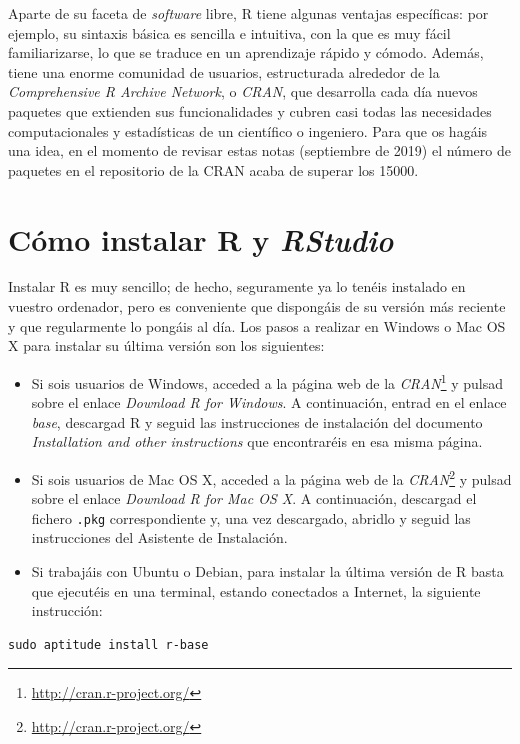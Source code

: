 \documentclass[
]{book}
\DeclareRobustCommand{\href}[2]{#2\footnote{\url{#1}}}
\theoremstyle{definition}
\theoremstyle{definition}
\theoremstyle{definition}
\theoremstyle{remark}
\begin{document}
Aparte de su faceta de \emph{software} libre, R tiene algunas ventajas específicas: por ejemplo, su sintaxis básica es sencilla e intuitiva, con la que es muy fácil familiarizarse, lo que se traduce en un aprendizaje rápido y cómodo. Además, tiene una enorme comunidad de usuarios, estructurada alrededor de la \emph{Comprehensive R Archive Network}, o \emph{CRAN}, que desarrolla cada día nuevos paquetes que extienden sus funcionalidades y cubren casi todas las necesidades computacionales y estadísticas de un científico o ingeniero. Para que os hagáis una idea, en el momento de revisar estas notas (septiembre de 2019) el número de paquetes en el repositorio de la CRAN acaba de superar los 15000.

\hypertarget{cuxf3mo-instalar-r-y-rstudio}{%
\section{\texorpdfstring{Cómo instalar R y \emph{RStudio}}{Cómo instalar R y RStudio}}\label{cuxf3mo-instalar-r-y-rstudio}}

Instalar R es muy sencillo; de hecho, seguramente ya lo tenéis instalado en vuestro ordenador, pero es conveniente que dispongáis de su versión más reciente y que regularmente lo pongáis al día. Los pasos a realizar en Windows o Mac OS X para instalar su última versión son los siguientes:

\begin{itemize}
\item
  Si sois usuarios de Windows, acceded a la página web de la \href{http://cran.r-project.org/}{\emph{CRAN}} y pulsad sobre el enlace \emph{Download R for Windows}. A continuación, entrad en el enlace \emph{base}, descargad R y seguid las instrucciones de instalación del documento \emph{Installation and other instructions} que encontraréis en esa misma página.
\item
  Si sois usuarios de Mac OS X, acceded a la página web de la \href{http://cran.r-project.org/}{\emph{CRAN}} y pulsad sobre el enlace \emph{Download R for Mac OS X}. A continuación, descargad el fichero \texttt{.pkg} correspondiente y, una vez descargado, abridlo y seguid las instrucciones del Asistente de Instalación.
\item
  Si trabajáis con Ubuntu o Debian, para instalar la última versión de R basta que ejecutéis en una terminal, estando conectados a Internet, la siguiente instrucción:
\end{itemize}

\begin{verbatim}
sudo aptitude install r-base
\end{verbatim}
\end{document}
